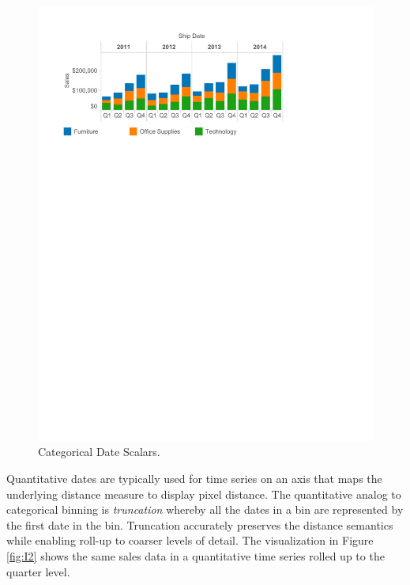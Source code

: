 \begin{figure}[ht]
\centering
\includegraphics[width=\columnwidth]{figures/FigureI1}
\caption{Categorical Date Scalars.}
\label{fig:I1}
\end{figure}

Quantitative dates are typically used for time series on an axis that maps the underlying distance measure to display pixel distance. The quantitative analog to categorical binning is \textit{truncation} whereby all the dates in a bin are represented by the first date in the bin. Truncation accurately preserves the distance semantics while enabling roll-up to coarser levels of detail. The visualization in Figure \ref{fig:I2} shows the same sales data in a quantitative time series rolled up to the quarter level.

